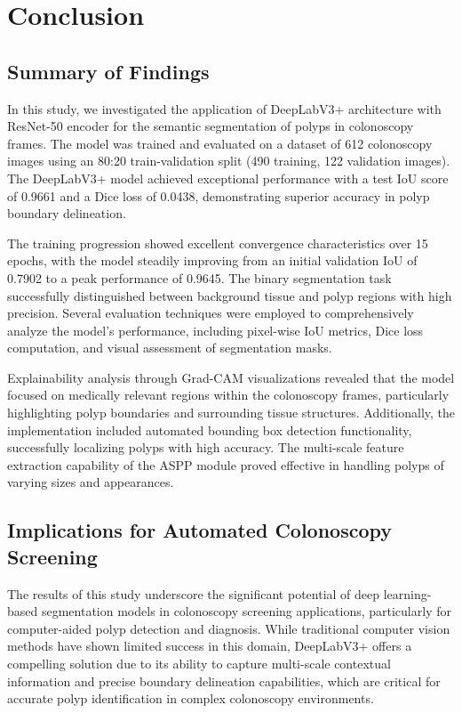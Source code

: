 \documentclass[a4paper,12pt]{report}
\begin{document}
\chapter{Conclusion}

\section{Summary of Findings}

In this study, we investigated the application of DeepLabV3+ architecture with ResNet-50 encoder for the semantic segmentation of polyps in colonoscopy frames. The model was trained and evaluated on a dataset of 612 colonoscopy images using an 80:20 train-validation split (490 training, 122 validation images). The DeepLabV3+ model achieved exceptional performance with a test IoU score of 0.9661 and a Dice loss of 0.0438, demonstrating superior accuracy in polyp boundary delineation.

The training progression showed excellent convergence characteristics over 15 epochs, with the model steadily improving from an initial validation IoU of 0.7902 to a peak performance of 0.9645. The binary segmentation task successfully distinguished between background tissue and polyp regions with high precision. Several evaluation techniques were employed to comprehensively analyze the model's performance, including pixel-wise IoU metrics, Dice loss computation, and visual assessment of segmentation masks.

Explainability analysis through Grad-CAM visualizations revealed that the model focused on medically relevant regions within the colonoscopy frames, particularly highlighting polyp boundaries and surrounding tissue structures. Additionally, the implementation included automated bounding box detection functionality, successfully localizing polyps with high accuracy. The multi-scale feature extraction capability of the ASPP module proved effective in handling polyps of varying sizes and appearances.

\section{Implications for Automated Colonoscopy Screening}

The results of this study underscore the significant potential of deep learning-based segmentation models in colonoscopy screening applications, particularly for computer-aided polyp detection and diagnosis. While traditional computer vision methods have shown limited success in this domain, DeepLabV3+ offers a compelling solution due to its ability to capture multi-scale contextual information and precise boundary delineation capabilities, which are critical for accurate polyp identification in complex colonoscopy environments.
\end{document}
